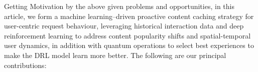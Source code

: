 \documentclass[journal]{IEEEtran}
\begin{document}


Getting Motivation by the above given problems and opportunities, in this article, we form a machine learning–driven proactive content caching strategy for user-centric request behaviour, leveraging historical interaction data and deep reinforcement learning to address content popularity shifts and spatial-temporal user dynamics, in addition with quantum operations to select best experiences to make the DRL model learn more better. The following are our principal contributions:
\end{document}
